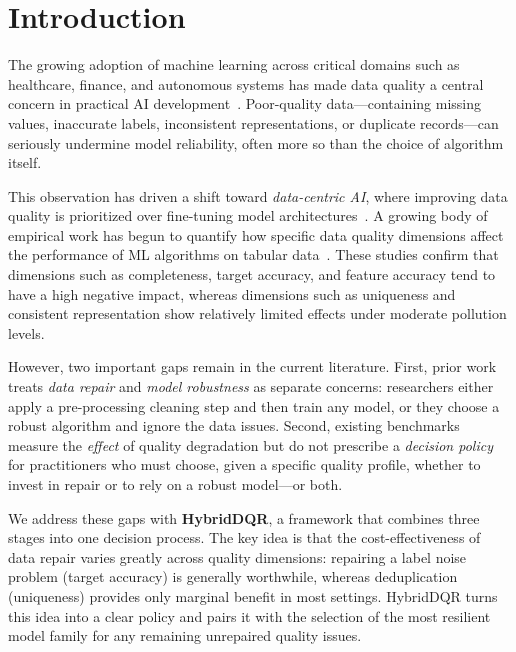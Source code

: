 \documentclass[runningheads]{llncs}
\begin{document}
\section{Introduction}
\label{sec:intro}

The growing adoption of machine learning across critical domains
such as healthcare, finance, and autonomous systems has made data
quality a central concern in practical AI development~\cite{groger2021}.
Poor-quality data—containing missing values, inaccurate labels,
inconsistent representations, or duplicate records—can seriously
undermine model reliability, often more so than the choice of
algorithm itself.

This observation has driven a shift toward \emph{data-centric AI},
where improving data quality is prioritized over fine-tuning model
architectures~\cite{ng2021}.
A growing body of empirical work has begun to quantify how specific
data quality dimensions affect the performance of ML algorithms on
tabular data~\cite{mohammed2025,budach2022}.
These studies confirm that dimensions such as completeness,
target accuracy, and feature accuracy tend to have a high negative
impact, whereas dimensions such as uniqueness and consistent
representation show relatively limited effects under moderate
pollution levels.

However, two important gaps remain in the current literature.
First, prior work treats \emph{data repair} and \emph{model
robustness} as separate concerns: researchers either apply a
pre-processing cleaning step and then train any model, or they
choose a robust algorithm and ignore the data issues.
Second, existing benchmarks measure the \emph{effect} of
quality degradation but do not prescribe a \emph{decision policy}
for practitioners who must choose, given a specific quality profile,
whether to invest in repair or to rely on a robust model—or both.

We address these gaps with \textbf{HybridDQR}, a framework
that combines three stages into one decision process.
The key idea is that the cost-effectiveness of data repair
varies greatly across quality dimensions:
repairing a label noise problem (target accuracy) is generally
worthwhile, whereas deduplication (uniqueness) provides only
marginal benefit in most settings.
HybridDQR turns this idea into a clear policy and
pairs it with the selection of the most resilient model family
for any remaining unrepaired quality issues.
\end{document}
